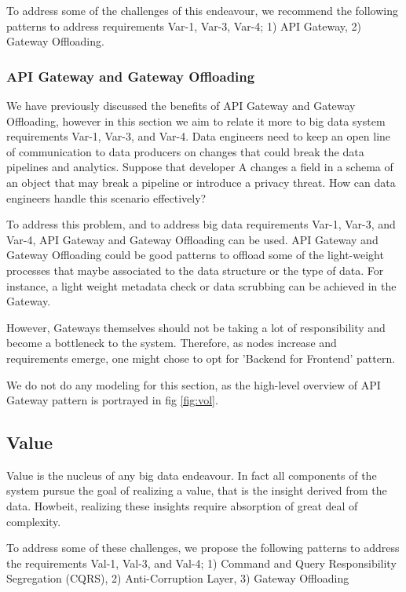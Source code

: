 \documentclass[conference]{IEEEtran}
\begin{document}
To address some of the challenges of this endeavour, we recommend the following patterns to address requirements Var-1, Var-3, Var-4; 1) API Gateway, 2) Gateway Offloading.

\subsubsection{API Gateway and Gateway Offloading}

We have previously discussed the benefits of API Gateway and Gateway Offloading, however in this section we aim to relate it more to big data system requirements Var-1, Var-3, and Var-4. Data engineers need to keep an open line of communication to data producers on changes that could break the data pipelines and analytics. Suppose that developer A changes a field in a schema of an object that may break a pipeline or introduce a privacy threat. How can data engineers handle this scenario effectively? 

To address this problem, and to address big data requirements Var-1, Var-3, and Var-4, API Gateway and Gateway Offloading can be used. API Gateway and Gateway Offloading could be good patterns to offload some of the light-weight processes that maybe associated to the data structure or the type of data. For instance, a light weight metadata check or data scrubbing can be achieved in the Gateway. 

However, Gateways themselves should not be taking a lot of responsibility and become a bottleneck to the system. Therefore, as nodes increase and requirements emerge, one might chose to opt for 'Backend for Frontend' pattern. 

We do not do any modeling for this section, as the high-level overview of API Gateway pattern is portrayed in fig \ref{fig:vol}.

\subsection{Value}

Value is the nucleus of any big data endeavour. In fact all components of the system pursue the goal of realizing a value, that is the insight derived from the data. Howbeit, realizing these insights require absorption of great deal of complexity. 

To address some of these challenges, we propose the following patterns to address the requirements Val-1, Val-3, and Val-4; 1) Command and Query Responsibility Segregation (CQRS), 2) Anti-Corruption Layer, 3) Gateway Offloading
\end{document}
